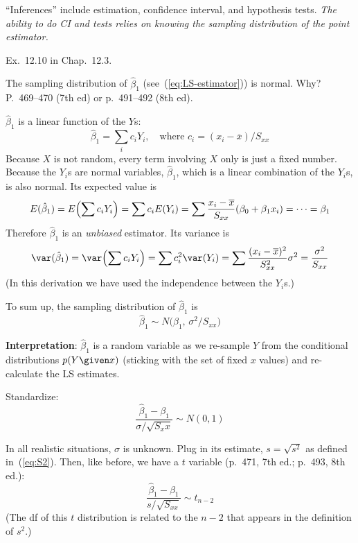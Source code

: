 \documentclass[12pt]{article}
\begin{document}
``Inferences'' include estimation, confidence interval, and hypothesis
tests.
\emph{The ability to do CI and tests relies on knowing the sampling
distribution of the point estimator.}

\example Ex.~12.10 in Chap.~12.3.

The sampling distribution of $\hat{\beta}_1$
(see~(\ref{eq:LS-estimator}))
is normal.
Why? P.~469--470 (7th ed) or p.~491--492 (8th ed).

$\hat{\beta}_1$ is a linear function of the $Y$s:
\[
\hat{\beta}_1 = \sum_i c_iY_i,
\quad \text{where } c_i = (x_i - \overline{x})/S_{xx}
\]
Because $X$ is not random,
every term involving $X$ only is just a fixed number.
Because the $Y_i$s are normal variables,
$\hat{\beta}_1$, which is a linear combination of the $Y_i$s, is also normal.
Its expected value is
\[
E(\hat{\beta}_1)
= E\Bigl(\sum c_iY_i\Bigr)
= \sum c_iE(Y_i)
= \sum \frac{x_i - \overline{x}}{S_{xx}} (\beta_0 + \beta_1x_i)
= \dotsb
= \beta_1
\]
Therefore $\hat{\beta}_1$ is an \emph{unbiased} estimator.
Its variance is
\[
\var(\hat{\beta}_1)
= \var\Bigl(\sum c_iY_i\Bigr)
= \sum c_i^2 \var(Y_i)
= \sum \frac{(x_i - \overline{x})^2}{S_{xx}^2} \sigma^2
= \frac{\sigma^2}{S_{xx}}
\]
(In this derivation we have used the independence between the $Y_i$s.)

To sum up, the sampling distribution of $\hat{\beta}_1$ is
\[
\hat{\beta}_1 \sim N\bigl(\beta_1,\, \sigma^2/S_{xx}\bigr)
\]

\textbf{Interpretation}:
$\hat{\beta}_1$ is a random variable
as we re-sample $Y$ from the conditional distributions
$p(Y\given x)$ (sticking with the set of fixed $x$ values)
and re-calculate the LS estimates.

Standardize:
\[
\frac{\hat{\beta}_1 - \beta_1}{\sigma / \sqrt{S_xx}}
\sim N(0,1)
\]

In all realistic situations,
$\sigma$ is unknown.
Plug in its estimate, $s = \sqrt{s^2}$
as defined in~(\ref{eq:S2}).
Then, like before, we have a $t$ variable
(p.~471, 7th ed.; p.~493, 8th ed.):
\[
\frac{\hat{\beta}_1 - \beta_1}{s / \sqrt{S_{xx}}}
\sim t_{n-2}
\]
(The df of this $t$ distribution is related to the $n-2$
that appears in the definition of $s^2$.)
\end{document}
